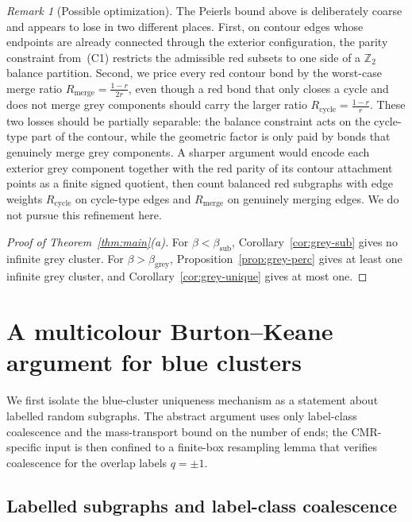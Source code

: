 \documentclass[11pt]{article}
\numberwithin{theorem}{section}
\theoremstyle{remark}
\newtheorem{remark}[theorem]{Remark}
\begin{document}
\begin{remark}[Possible optimization]
The Peierls bound above is deliberately coarse and appears to lose in two different places. First, on contour edges whose endpoints are already connected through the exterior configuration, the parity constraint from~(C1) restricts the admissible red subsets to one side of a $\mathbb{Z}_2$ balance partition. Second, we price every red contour bond by the worst-case merge ratio $R_{\mathrm{merge}} = \frac{1-r}{2r}$, even though a red bond that only closes a cycle and does not merge grey components should carry the larger ratio $R_{\mathrm{cycle}} = \frac{1-r}{r}$. These two losses should be partially separable: the balance constraint acts on the cycle-type part of the contour, while the geometric factor is only paid by bonds that genuinely merge grey components. A sharper argument would encode each exterior grey component together with the red parity of its contour attachment points as a finite signed quotient, then count balanced red subgraphs with edge weights $R_{\mathrm{cycle}}$ on cycle-type edges and $R_{\mathrm{merge}}$ on genuinely merging edges. We do not pursue this refinement here.
\end{remark}

\begin{proof}[Proof of Theorem~\ref{thm:main}\textup{(a)}]
For $\beta < \beta_{\mathrm{sub}}$, Corollary~\ref{cor:grey-sub} gives no infinite grey cluster.
For $\beta > \beta_{\mathrm{grey}}$, Proposition~\ref{prop:grey-perc} gives at least one infinite grey cluster, and Corollary~\ref{cor:grey-unique} gives at most one.
\end{proof}


\section{A multicolour Burton--Keane argument for blue clusters}\label{sec:bk}

We first isolate the blue-cluster uniqueness mechanism as a statement about labelled random subgraphs.
The abstract argument uses only label-class coalescence and the mass-transport bound on the number of ends; the CMR-specific input is then confined to a finite-box resampling lemma that verifies coalescence for the overlap labels $q=\pm1$.

\subsection{Labelled subgraphs and label-class coalescence}\label{sec:label-coalescence}
\end{document}
